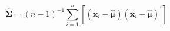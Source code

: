 \begin{equation}
    \widehat{\boldsymbol{\Sigma}}
    =
    \left(
      n - 1
    \right)^{-1}
    \sum_{i = 1}^{n}
    \left[
    \left(
    \mathbf{x}_{i}
    -
    \hat{\boldsymbol{\mu}}
    \right)
    \left(
    \mathbf{x}_{i}
    -
    \hat{\boldsymbol{\mu}}
    \right)^{\prime}
    \right]
    \label{eq:sigmaMatrix-sigmacaphat-unbiased}
\end{equation}
